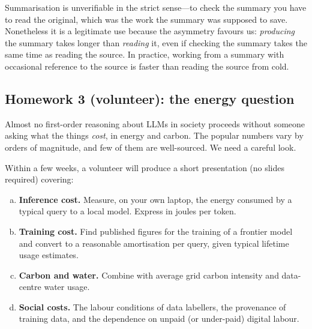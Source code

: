 \begin{audience}
  Summarisation is unverifiable in the strict sense---to
  check the summary you have to read the original, which was
  the work the summary was supposed to save.  Nonetheless it
  is a legitimate use because the asymmetry favours us:
  \emph{producing} the summary takes longer than \emph{reading}
  it, even if checking the summary takes the same time as
  reading the source.  In practice, working from a summary
  with occasional reference to the source is faster than
  reading the source from cold.
\end{audience}

\subsection{Homework 3 (volunteer): the energy question}

Almost no first-order reasoning about LLMs in society proceeds
without someone asking what the things \emph{cost}, in energy
and carbon.  The popular numbers vary by orders of magnitude,
and few of them are well-sourced.  We need a careful look.

\begin{keyresult}
  Within a few weeks, a volunteer will produce a short
  presentation (no slides required) covering:
  \begin{enumerate}[(a)]
    \item \textbf{Inference cost.}  Measure, on your own
      laptop, the energy consumed by a typical query to a
      local model.  Express in joules per token.
    \item \textbf{Training cost.}  Find published figures
      for the training of a frontier model and convert to a
      reasonable amortisation per query, given typical
      lifetime usage estimates.
    \item \textbf{Carbon and water.}  Combine with average
      grid carbon intensity and data-centre water usage.
    \item \textbf{Social costs.}  The labour conditions of
      data labellers, the provenance of training data, and
      the dependence on unpaid (or under-paid) digital
      labour.
  \end{enumerate}
\end{keyresult}

